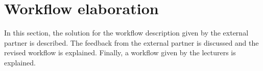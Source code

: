 \section{Workflow elaboration \label{sec:WorkflowElaboration}}
In this section, the solution for the workflow description given by the external partner is described. The feedback from the external partner is discussed and the revised workflow is explained. Finally, a workflow given by the lecturers is explained.






